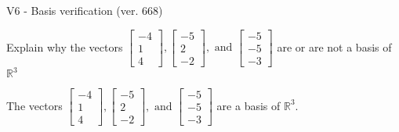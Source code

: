 \begin{exercise}
  \begin{exerciseTitle}V6 - Basis verification (ver. 668)\end{exerciseTitle}
  \begin{exerciseStatement}
    Explain why the vectors \(\left[\begin{array}{r}
-4 \\
1 \\
4
\end{array}\right] , \left[\begin{array}{r}
-5 \\
2 \\
-2
\end{array}\right] , \text{ and } \left[\begin{array}{r}
-5 \\
-5 \\
-3
\end{array}\right]\) are or are not a basis of \(\mathbb{R}^3\)	


  \end{exerciseStatement}
  \begin{exerciseAnswer}
   The vectors \(\left[\begin{array}{r}
-4 \\
1 \\
4
\end{array}\right] , \left[\begin{array}{r}
-5 \\
2 \\
-2
\end{array}\right] , \text{ and } \left[\begin{array}{r}
-5 \\
-5 \\
-3
\end{array}\right]\) 
  	 are  a basis of \(\mathbb{R}^3\).
  


  \end{exerciseAnswer}
\end{exercise}